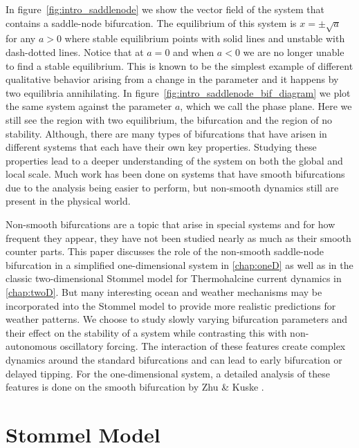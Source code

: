 In figure~\ref{fig:intro_saddlenode} we show the vector field of the system that contains a saddle-node bifurcation. The equilibrium of this system is $x=\pm \sqrt{a}$ for any $a>0$ where stable equilibrium points with solid lines and unstable with dash-dotted lines. Notice that at $a=0$ and when $a<0$ we are no longer unable to find a stable equilibrium. This is known to be the simplest example of different qualitative behavior arising from a change in the parameter and it happens by two equilibria annihilating. In figure~\ref{fig:intro_saddlenode_bif_diagram} we plot the same system against the parameter $a$, which we call the phase plane. Here we still see the region with two equilibrium, the bifurcation and the region of no stability. Although, there are many types of bifurcations that have arisen in different systems that each have their own key properties. Studying these properties lead to a deeper understanding of the system on both the global and local scale. Much work has been done on systems that have smooth bifurcations due to the analysis being easier to perform, but non-smooth dynamics still are present in the physical world.

Non-smooth bifurcations are a topic that arise in special systems and for how frequent they appear, they have not been studied nearly as much as their smooth counter parts. This paper discusses the role of the non-smooth saddle-node bifurcation in a simplified one-dimensional system in \autoref{chap:oneD} as well as in the classic two-dimensional Stommel model for Thermohalcine current dynamics in \autoref{chap:twoD}. But many interesting ocean and weather mechanisms may be incorporated into the Stommel model to provide more realistic predictions for weather patterns. We choose to study slowly varying bifurcation parameters and their effect on the stability of a system while contrasting this with non-autonomous oscillatory forcing. The interaction of these features create complex dynamics around the standard bifurcations and can lead to early bifurcation or delayed tipping. For the one-dimensional system, a detailed analysis of these features is done on the smooth bifurcation by Zhu \& Kuske \cite{zhu2015tipping}.

\section*{Stommel Model}

